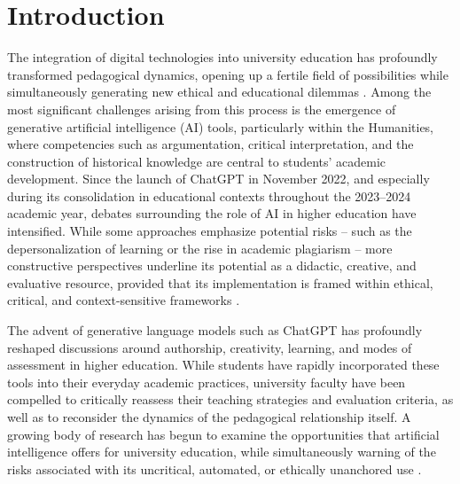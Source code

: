 \documentclass[english]{textolivre}
\begin{document}
\section{Introduction}\label{sec-1}
The integration of digital technologies into university education has profoundly transformed pedago\-gical dynamics, opening up a fertile field of possibilities while simultaneously generating new ethical and educational dilemmas \cite{scott2024, tondeur2025, zhou2024}. Among the most significant challenges arising from this process is the emergence of generative artificial intelligence (AI) tools, particularly within the Humanities, where competencies such as argumentation, critical interpretation, and the construction of historical knowledge are central to students’ academic development. Since the launch of ChatGPT in November 2022, and especially during its consolidation in educational contexts throughout the 2023–2024 academic year, debates surrounding the role of AI in higher education have intensified. While some approaches emphasize potential risks -- such as the depersonalization of learning or the rise in academic plagiarism -- more constructive perspectives underline its potential as a didactic, creative, and evaluative resource, provided that its implementation is framed within ethical, critical, and context-sensitive frameworks  \cite{evangelista2025, gammoh2025, luo2025}.

The advent of generative language models such as ChatGPT has profoundly reshaped discussions around authorship, creativity, learning, and modes of assessment in higher education. While students have rapidly incorporated these tools into their everyday academic practices, university faculty have been compelled to critically reassess their teaching strategies and evaluation criteria, as well as to reconsider the dynamics of the pedagogical relationship itself. A growing body of research has begun to examine the opportunities that artificial intelligence offers for university education, while simultaneously warning of the risks associated with its uncritical, automated, or ethically unanchored use \cite{gammoh2025, holmes2019, knox2020, luckin2016, ofem2025, selwyn2021}.
\end{document}
